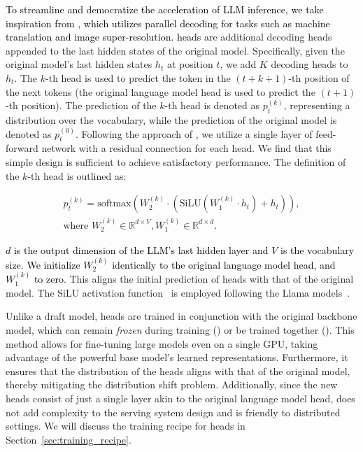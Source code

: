 \textcolor{black}{To streamline and democratize the acceleration of LLM inference, we take inspiration from \citet{stern2018blockwise}, which utilizes parallel decoding for tasks such as machine translation and image super-resolution. \ours heads}
 are additional decoding heads appended to the last hidden states of the original model. Specifically, given the original model's last hidden states $h_t$ at position $t$, we add $K$ decoding heads to $h_t$. The $k$-th head is used to predict the token in the $(t+k+1)$-th position of the next tokens (the original language model head is used to predict the $(t+1)$-th position). The prediction of the $k$-th head is denoted as $p_t^{(k)}$, representing a distribution over the vocabulary, while the prediction of the original model is denoted as $p_t^{(0)}$. Following the approach of \citet{stern2018blockwise}, we utilize a single layer of feed-forward network with a residual connection for each head. We find that this simple design is sufficient to achieve satisfactory performance. The definition of the $k$-th head is outlined as:

\begin{align*}
p_t^{(k)} = \text{softmax}\left(W_2^{(k)} \cdot \left(\text{SiLU}(W_1^{(k)} \cdot h_t)+h_t\right)\right),\\
\text{where } W_2^{(k)}\in\mathbb{R}^{d\times V}, W_1^{(k)}\in\mathbb{R}^{d\times d}.
\end{align*}

\textcolor{black}{$d$ is the output dimension of the LLM's last hidden layer and $V$ is the vocabulary size.}
\textcolor{black}{We initialize $W_2^{(k)}$ identically to the original language model head, and $W_1^{(k)}$ to zero.}
This aligns the initial prediction of \ours heads with that of the original model. The SiLU activation function~\citep{elfwing2017sigmoidweighted} is employed following the Llama models~\citep{touvron2023llama}.

Unlike a draft model, \ours heads are trained in conjunction with the original backbone model, which can remain \emph{frozen} during training () or be trained together (). This method allows for fine-tuning large models even on a single GPU, taking advantage of the powerful base model's learned representations. Furthermore, it ensures that the distribution of the \ours heads aligns with that of the original model, thereby mitigating the distribution shift problem. Additionally, since the new heads consist of just a single layer akin to the original language model head, \ours does not add complexity to the serving system design and is friendly to distributed settings. We will discuss the training recipe for \ours heads in Section~\ref{sec:training_recipe}.

